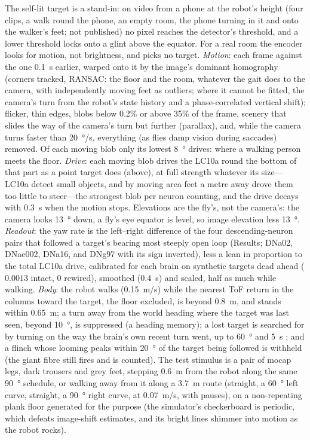 \documentclass[10pt,a4paper]{article}
\begin{document}
The self-lit target is a stand-in: on video from a phone at the robot's height (four clips, a walk round
the phone, an empty room, the phone turning in it and onto the walker's feet; not published) no pixel
reaches the detector's threshold, and a lower threshold locks onto a glint above the equator. For a real
room the encoder looks for motion, not brightness, and picks no target. \emph{Motion}: each frame against
the one \SI{0.1}{s} earlier, warped onto it by the image's dominant homography (corners tracked, RANSAC:
the floor and the room, whatever the gait does to the camera, with independently moving feet as outliers;
where it cannot be fitted, the camera's turn from the robot's state history and a phase-correlated
vertical shift); flicker, thin edges,
blobs below 0.2\% or above 35\% of the frame, scenery that slides the way of the camera's turn but further
(parallax), and, while the camera turns faster than \SI{20}{\degree/s}, everything (as flies damp vision
during saccades) removed. Of each moving blob only its lowest \SI{8}{\degree} drives: where a walking person
meets the floor. \emph{Drive}: each moving blob drives the LC10a round the bottom of that part as a point
target does (above), at full strength whatever its size---LC10a detect small objects, and by moving area
feet a metre away drove them too little to steer---the strongest blob per neuron counting, and the drive
decays with \SI{0.3}{s} when the motion stops. Elevations are the fly's, not the camera's: the camera
looks \SI{13}{\degree} down, a fly's eye equator is level, so image elevation less \SI{13}{\degree}. \emph{Readout}: the yaw rate is the left--right difference of the four descending-neuron
pairs that followed a target's bearing most steeply open loop (Results; DNa02, DNae002, DNa16, and DNg97
with its sign inverted), less a lean in proportion to the total LC10a drive, calibrated for each brain on
synthetic targets dead ahead ($0.0013$ intact, $0$ rewired), smoothed (\SI{0.4}{s}) and scaled, half as much
while walking. \emph{Body}: the robot walks (\SI{0.15}{m/s}) while the nearest ToF return in the columns
toward the target, the floor excluded, is beyond \SI{0.8}{m}, and stands within \SI{0.65}{m}; a turn away
from the world heading where the target was last seen, beyond \SI{10}{\degree}, is suppressed (a heading
memory); a lost target is searched for by turning on the way the brain's own recent turn went, up to
\SI{60}{\degree} and \SI{5}{s} \cite{neuser2008}; and a flinch whose looming peaks within
\SI{20}{\degree} of the target being followed is withheld (the giant fibre still fires and is
counted). The test stimulus is a pair of mocap legs, dark trousers and grey feet, stepping
\SI{0.6}{m} from the robot along the same \SI{90}{\degree} schedule, or walking away from it along a
\SI{3.7}{m} route (straight, a \SI{60}{\degree} left curve, straight, a \SI{90}{\degree} right curve, at
\SI{0.07}{m/s}, with pauses), on a non-repeating plank floor
generated for the purpose (the simulator's checkerboard is periodic, which defeats image-shift estimates,
and its bright lines shimmer into motion as the robot rocks).
\end{document}
